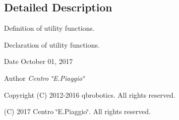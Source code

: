 \subsection{Detailed Description}
Definition of utility functions. 

Declaration of utility functions.

\begin{DoxyDate}{Date}
October 01, 2017 
\end{DoxyDate}
\begin{DoxyAuthor}{Author}
{\itshape Centro \char`\"{}\+E.\+Piaggio\char`\"{}} 
\end{DoxyAuthor}
\begin{DoxyCopyright}{Copyright}
(C) 2012-\/2016 qbrobotics. All rights reserved. 

(C) 2017 Centro \char`\"{}\+E.\+Piaggio\char`\"{}. All rights reserved. 
\end{DoxyCopyright}
